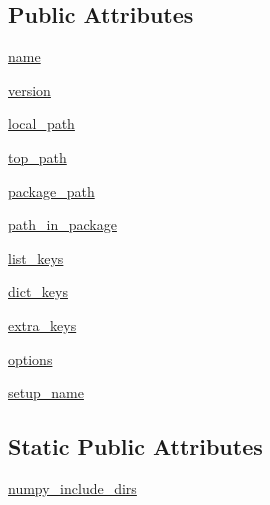 \subsection*{Public Attributes}
\begin{DoxyCompactItemize}
\item 
\hyperlink{classnumpy_1_1distutils_1_1misc__util_1_1Configuration_a0180c0a7786ccd3a68947c7b38d4a4b1}{name}
\item 
\hyperlink{classnumpy_1_1distutils_1_1misc__util_1_1Configuration_a60ce80d2bcaf570b4415e6a09ec2b0f8}{version}
\item 
\hyperlink{classnumpy_1_1distutils_1_1misc__util_1_1Configuration_a78d5c109da36e6b3e1a68181d7ed545d}{local\+\_\+path}
\item 
\hyperlink{classnumpy_1_1distutils_1_1misc__util_1_1Configuration_a02058551ba5f633857f97647a326db34}{top\+\_\+path}
\item 
\hyperlink{classnumpy_1_1distutils_1_1misc__util_1_1Configuration_a9b07575613365c1d66611d2d9c39c44f}{package\+\_\+path}
\item 
\hyperlink{classnumpy_1_1distutils_1_1misc__util_1_1Configuration_aa32b7eb883aa719c6d5c12a01e3c03ba}{path\+\_\+in\+\_\+package}
\item 
\hyperlink{classnumpy_1_1distutils_1_1misc__util_1_1Configuration_a8ecd8dceaee07a72c077e9312a2189e7}{list\+\_\+keys}
\item 
\hyperlink{classnumpy_1_1distutils_1_1misc__util_1_1Configuration_a6db93afd7f5e02b616c77c049ea823ea}{dict\+\_\+keys}
\item 
\hyperlink{classnumpy_1_1distutils_1_1misc__util_1_1Configuration_a1604c74428fad8c0c56eed76efaee547}{extra\+\_\+keys}
\item 
\hyperlink{classnumpy_1_1distutils_1_1misc__util_1_1Configuration_a92d0da999633c6c9c7517b6bd941826a}{options}
\item 
\hyperlink{classnumpy_1_1distutils_1_1misc__util_1_1Configuration_a9969f6728bba9110ddff25d7d4a53ff9}{setup\+\_\+name}
\end{DoxyCompactItemize}
\subsection*{Static Public Attributes}
\begin{DoxyCompactItemize}
\item 
\hyperlink{classnumpy_1_1distutils_1_1misc__util_1_1Configuration_ae2e804b4caf20474a23c8c7b00f20e30}{numpy\+\_\+include\+\_\+dirs}
\end{DoxyCompactItemize}


